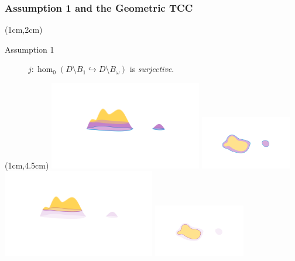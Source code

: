 \begin{frame}
  \frametitle{{\small Assumption 1 and the Geometric TCC}}

  \begin{textblock*}{11cm}(1cm,2cm)
    \begin{small}
      \begin{description}
        \item[Assumption 1] $j : \hom_0(D\setminus B_{1}\hookrightarrow D\setminus B_\omega)$ is \emph{surjective}.
      \end{description}

    \end{small}
  \end{textblock*}

  \begin{textblock*}{11cm}(1cm,4.5cm)
    \includegraphics[trim=200 300 200 200, clip, width=0.5\textwidth]{../scripts/figures/surf/ass1_C_side.png}
    \includegraphics[trim=300 150 200 200, clip, width=0.3\textwidth]{../scripts/figures/surf/ass1_C_top.png}
    \includegraphics[trim=200 300 200 200, clip, width=0.5\textwidth]{../scripts/figures/surf/ass1_D_side.png}
    \includegraphics[trim=300 150 200 200, clip, width=0.3\textwidth]{../scripts/figures/surf/ass1_D_top.png}
  \end{textblock*}
\end{frame}



